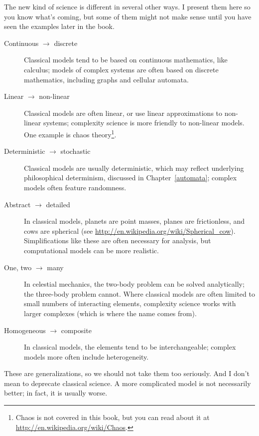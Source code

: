 \documentclass[10pt]{book}
\begin{document}
The new kind of science is different in several other
ways.  I present them here so you know what's coming, but some of them
might not make sense until you have seen the examples later in the
book.

\begin{description}

\item[Continuous $\rightarrow$ discrete] Classical models tend to be
  based on continuous mathematics, like calculus; models of complex
  systems are often based on discrete mathematics, including graphs and
  cellular automata.

\item[Linear $\rightarrow$ non-linear] Classical models are often
  linear, or use linear approximations to non-linear systems;
  complexity science is more friendly to non-linear models.  One example
  is chaos theory\footnote{Chaos is not covered in this book, but you can
  read about it at \url{http://en.wikipedia.org/wiki/Chaos}.}.

\item[Deterministic $\rightarrow$ stochastic] Classical models are
  usually deterministic, which may reflect underlying philosophical
  determinism, discussed in Chapter~\ref{automata}; complex models
  often feature randomness.

\item[Abstract $\rightarrow$ detailed] In classical models, planets are
  point masses, planes are frictionless, and cows are
  spherical (see \url{http://en.wikipedia.org/wiki/Spherical_cow}).
  Simplifications like these are often necessary for analysis,
  but computational models can be more realistic.

\item[One, two $\rightarrow$ many] In celestial mechanics, the
  two-body problem can be solved analytically; the three-body problem
  cannot.  Where classical models are often limited to
  small numbers of interacting elements, complexity science works with
  larger complexes (which is where the name comes from).

\item[Homogeneous $\rightarrow$ composite] In classical models, the
  elements tend to be interchangeable; complex models more often
  include heterogeneity.

\end{description}

These are generalizations, so we should not take them
too seriously.  And I don't mean to deprecate
classical science.  A more complicated model is not necessarily better;
in fact, it is usually worse.
\end{document}
